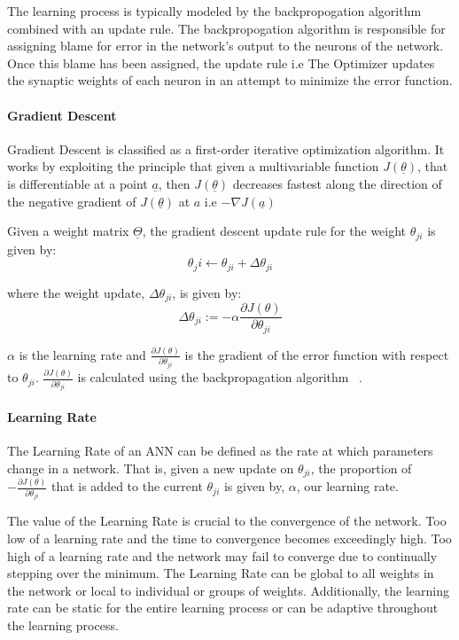 \documentclass{article}
\begin{document}
The learning process is typically modeled by the backpropogation algorithm combined with an update rule. The backpropogation algorithm is responsible for assigning blame for error in the network's output to the neurons of the network. Once this blame has been assigned, the update rule i.e The Optimizer updates the synaptic weights of each neuron in an attempt to minimize the error function.

\paragraph{Gradient Descent}
Gradient Descent is classified as a first-order iterative optimization algorithm. It works by exploiting the principle that given a multivariable function $J(\underline\theta)$, that is differentiable at a point $\underline{a}$, then $J(\underline\theta)$ decreases fastest along the direction of the negative gradient of $J(\underline\theta)$ at $a$ i.e $-\nabla{J(\underline{a})}$
 
Given a weight matrix $\underline\Theta$, the gradient descent update rule for the weight $\theta_{ji}$ is given by:
\begin{equation}
\theta_ji \leftarrow \theta_{ji} + \Delta\theta_{ji}
\end{equation}

where the weight update, $\Delta\theta_{ji}$, is given by:
\begin{equation}
	\Delta\theta_{ji} := -\alpha\frac{\partial{J}(\theta)}{\partial{\theta_{ji}}}
\end{equation}
 

 $\alpha$ is the learning rate and $\frac{\partial{J}(\theta)}{\partial{\theta_{ji}}}$ is the gradient of the error function with respect to $\theta_{ji}$.
$\frac{\partial{J}(\theta)}{\partial{\theta_{ji}}}$ is calculated using the backpropagation algorithm ~\cite{backpropagationOriginal}.

 
\paragraph{Learning Rate}
The Learning Rate of an ANN can be defined as the rate at which parameters change in a network. That is, given a new update on $\theta_{ji}$, the proportion of $-\frac{\partial{J}(\theta)}{\partial{\theta_{ji}}}$ that is added to the current $\theta_{ji}$ is given by, $\alpha$, our learning rate.
\hfill\newline

The value of the Learning Rate is crucial to the convergence of the network. Too low of a learning rate and the time to convergence becomes exceedingly high. Too high of a learning rate and the network may fail to converge due to continually stepping over the minimum. The Learning Rate can be global to all weights in the network or local to individual or groups of weights. Additionally, the learning rate can be static for the entire learning process or can be adaptive throughout the learning process.  
\end{document}
